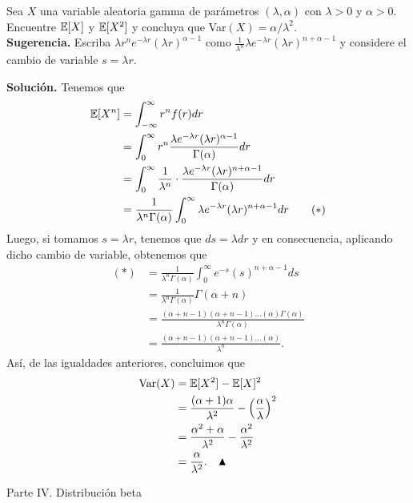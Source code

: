 \documentclass[11pt]{scrartcl}
\begin{document}
\begin{mdframed}[style=mdpurplebox, frametitle={Ejercicio 05, Tarea 11, Probabilidad y Estadística I}]
    Sea $X$ una variable aleatoria gamma de parámetros $(\lambda,\alpha)$ con $\lambda>0$ y $\alpha>0$. Encuentre $\mathbb E[X]$ y $\mathbb E[X^2]$ y
    concluya que Var$(X)=\alpha/\lambda^2$. \\
    \textbf{Sugerencia.} Escriba $\lambda r^{n}e^{-\lambda r}(\lambda r)^{\alpha-1}$ como $\frac{1}{\lambda^n}\lambda e^{-\lambda r}(\lambda r)^{n+\alpha-1}$
    y considere el cambio de variable $s=\lambda r$.
\end{mdframed}
\textbf{Solución.}
Tenemos que
\begin{align*}
    \mathbb E[X^n] &= \int_{-\infty}^{\infty}r^nf(r)dr \\
    &= \int_{0}^{\infty}r^n\frac{\lambda e^{-\lambda r}(\lambda r)^{\alpha-1}}{\Gamma(\alpha)}dr \\
    &=\int_{0}^{\infty}\frac{1}{\lambda^n}\cdot\frac{\lambda e^{-\lambda r}(\lambda r)^{n+\alpha-1}}{\Gamma(\alpha)}dr \\
    &=\frac{1}{\lambda^n\Gamma(\alpha)}\int_{0}^{\infty}\lambda e^{-\lambda r}(\lambda r)^{n+\alpha-1}dr \tag{$\ast$}
\end{align*}
Luego, si tomamos $s=\lambda r$, tenemos que $ds=\lambda dr$ y en consecuencia, aplicando dicho cambio de variable, obtenemos que
\begin{align*}
    (\ast) &= \frac{1}{\lambda^n\Gamma(\alpha)}\int_{0}^{\infty}e^{-s}(s)^{n+\alpha-1}ds \\
    &= \frac{1}{\lambda^n\Gamma(\alpha)}\Gamma(\alpha+n) \\
    &= \frac{(\alpha+n-1)(\alpha+n-1)...(\alpha)\Gamma(\alpha)}{\lambda^n\Gamma(\alpha)} \\
    &= \frac{(\alpha+n-1)(\alpha+n-1)...(\alpha)}{\lambda^n}.
\end{align*}
Así, de las igualdades anteriores, concluimos que
\begin{align*}
    \text{Var}(X) &= \mathbb E[X^2]-\mathbb E[X]^2 \\
    &= \frac{(\alpha+1)\alpha}{\lambda^2} - \left(\frac{\alpha}{\lambda}\right)^2 \\
    &= \frac{\alpha^2+\alpha}{\lambda^2} - \frac{\alpha^2}{\lambda^2} \\
    &= \frac{\alpha}{\lambda^2}. \quad \blacktriangle
\end{align*}
\newpage

\begin{center}
    Parte IV. Distribución beta
\end{center}
\end{document}
